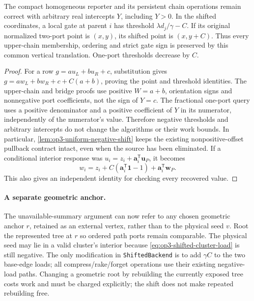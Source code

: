 \begin{lemma}
\label{lem:op3-shifted-reporters}
The compact homogeneous reporter and its persistent chain operations remain
correct with arbitrary real intercepts $Y$, including $Y>0$.
In the shifted coordinates, a local gate at parent $i$ has threshold
$\lambda d_j/\gamma-C$. If its original normalized two-port point is $(x,y)$,
its shifted point is $(x,y+C)$. Thus every upper-chain membership, ordering
and strict gate sign is preserved by this common vertical translation.
One-port thresholds decrease by $C$.
\end{lemma}
\begin{proof}
For a row $g=a u_L+b u_R+c$, substitution gives
$g=a w_L+b w_R+c+C(a+b)$, proving the point and threshold identities.
The upper-chain and bridge proofs use positive $W=a+b$, orientation signs
and nonnegative port coefficients, not the sign of $Y=c$. The fractional
one-port query uses a positive denominator and a positive coefficient of
$Y$ in its numerator, independently of the numerator's value. Therefore
negative thresholds and arbitrary intercepts do not change the algorithms
or their work bounds. In particular, \cref{lem:op3-uniform-negative-shift}
keeps the existing nonpositive-offset pullback contract intact, even when
the source has been eliminated. If a conditional interior response was
$u_i=z_i+\boldsymbol a_i^{\mathsf T}\boldsymbol u_P$, it becomes
\[
 w_i=z_i+C(\boldsymbol a_i^{\mathsf T}\boldsymbol1-1)
       +\boldsymbol a_i^{\mathsf T}\boldsymbol w_P.
\]
This also gives an independent identity for checking every recovered value.
\end{proof}

\paragraph{A separate geometric anchor.}
The unavailable-summary argument can now refer to any chosen geometric
anchor $r$, retained as an external vertex, rather than to the physical seed
$v$. Root the represented tree at $r$ so ordered path ports remain
comparable. The physical seed may lie in a valid cluster's interior because
\eqref{eq:op3-shifted-cluster-load} is still negative. The only modification
in \texttt{ShiftedBackend} is to add $\gamma C$ to the two base-edge loads;
all compress/rake/forget operations use their existing negative-load paths.
Changing a geometric root by rebuilding the currently exposed tree costs
work and must be charged explicitly; the shift does not make repeated
rebuilding free.

